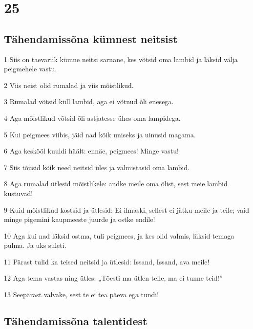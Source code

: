 \chapter{25}

\section*{Tähendamissõna kümnest neitsist}

\par 1 Siis on taevariik kümne neitsi sarnane, kes võtsid oma lambid ja läksid välja peigmehele vastu.
\par 2 Viis neist olid rumalad ja viis mõistlikud.
\par 3 Rumalad võtsid küll lambid, aga ei võtnud õli enesega.
\par 4 Aga mõistlikud võtsid õli astjatesse ühes oma lampidega.
\par 5 Kui peigmees viibis, jäid nad kõik uniseks ja uinusid magama.
\par 6 Aga keskööl kuuldi häält: ennäe, peigmees! Minge vastu!
\par 7 Siis tõusid kõik need neitsid üles ja valmistasid oma lambid.
\par 8 Aga rumalad ütlesid mõistlikele: andke meile oma õlist, sest meie lambid kustuvad!
\par 9 Kuid mõistlikud kostsid ja ütlesid: Ei ilmaski, sellest ei jätku meile ja teile; vaid minge pigemini kaupmeeste juurde ja ostke endile!
\par 10 Aga kui nad läksid ostma, tuli peigmees, ja kes olid valmis, läksid temaga pulma. Ja uks suleti.
\par 11 Pärast tulid ka teised neitsid ja ütlesid: Issand, Issand, ava meile!
\par 12 Aga tema vastas ning ütles: „Tõesti ma ütlen teile, ma ei tunne teid!”
\par 13 Seepärast valvake, sest te ei tea päeva ega tundi!

\section*{Tähendamissõna talentidest}

